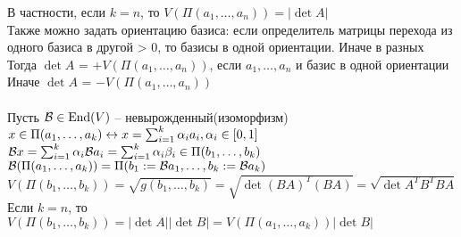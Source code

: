 \documentclass[12pt]{article}
\begin{document}
В частности, если $k = n$, то $V(\Pi(a_1, \ldots, a_n)) = |\det A|$\\
Также можно задать ориентацию базиса: если определитель матрицы перехода из одного базиса в другой > 0, то базисы в одной ориентации. Иначе в разных\\
Тогда $\det A$ = $+V(\Pi(a_1, \ldots, a_n))$, если $a_1, \ldots, a_n$ и базис в одной ориентации\\
Иначе $\det A$ = $-V(\Pi(a_1, \ldots, a_n))$\\\\
Пусть $\mathcal{B} \in \operatorname{End}(V)$ -- невырожденный(изоморфизм)\\
$x \in \Pi(a_1, \ldots, a_k) \leftrightarrow x = \sum_{i=1}^k \alpha_i a_i, \alpha_i \in [0,1]$\\
$\mathcal B x = \sum_{i=1}^k \alpha_i \mathcal{B} a_i = \sum_{i=1}^k \alpha_i \beta_i \in \Pi(b_1, \ldots, b_k)$\\
$\mathcal{B}(\Pi(a_1, \ldots, a_k)) = \Pi(b_1 := \mathcal{B} a_1, \ldots, b_k := \mathcal{B} a_k)$\\
$V(\Pi(b_1, \ldots, b_k)) = \sqrt{g(b_1, \ldots, b_k)} = \sqrt{\det (BA)^T (BA)} = \sqrt{\det A^TB^TBA}$\\
Если $k = n$, то $V(\Pi(b_1, \ldots, b_k)) = |\det A||\det B| = V(\Pi(a_1, \ldots, a_k)) |\det B|$
\end{document}
